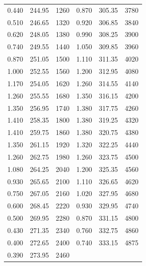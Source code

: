 \begin{table}[H]
\begin{tabular}{S S S S S S}
    0.440 & 244.95 & 1260 & 0.870 & 305.35 & 3780 \\
    0.510 & 246.65 & 1320 & 0.920 & 306.85 & 3840 \\
    0.620 & 248.05 & 1380 & 0.990 & 308.25 & 3900 \\
    0.740 & 249.55 & 1440 & 1.050 & 309.85 & 3960 \\
    0.870 & 251.05 & 1500 & 1.110 & 311.35 & 4020 \\
    1.000 & 252.55 & 1560 & 1.200 & 312.95 & 4080 \\
    1.170 & 254.05 & 1620 & 1.260 & 314.55 & 4140 \\
    1.260 & 255.55 & 1680 & 1.350 & 316.15 & 4200 \\
    1.350 & 256.95 & 1740 & 1.380 & 317.75 & 4260 \\
    1.410 & 258.35 & 1800 & 1.380 & 319.25 & 4320 \\
    1.410 & 259.75 & 1860 & 1.380 & 320.75 & 4380 \\
    1.350 & 261.15 & 1920 & 1.320 & 322.25 & 4440 \\
    1.260 & 262.75 & 1980 & 1.260 & 323.75 & 4500 \\
    1.080 & 264.25 & 2040 & 1.200 & 325.35 & 4560 \\
    0.930 & 265.65 & 2100 & 1.110 & 326.65 & 4620 \\
    0.750 & 267.05 & 2160 & 1.020 & 327.95 & 4680 \\
    0.600 & 268.45 & 2220 & 0.930 & 329.95 & 4740 \\
    0.500 & 269.95 & 2280 & 0.870 & 331.15 & 4800 \\
    0.430 & 271.35 & 2340 & 0.760 & 332.75 & 4860 \\
    0.400 & 272.65 & 2400 & 0.740 & 333.15 & 4875 \\
    0.390 & 273.95 & 2460 &       &        &      \\
    \bottomrule
  \end{tabular}
\end{table}

